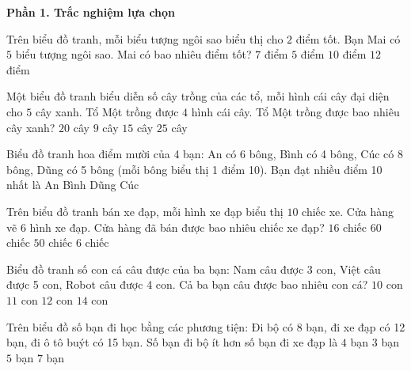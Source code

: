 \textbf{Phần 1. Trắc nghiệm lựa chọn}

\begin{ex} %
Trên biểu đồ tranh, mỗi biểu tượng ngôi sao biểu thị cho $2$ điểm tốt. Bạn Mai có $5$ biểu tượng ngôi sao. Mai có bao nhiêu điểm tốt?
\choice
{$7$ điểm}
{$5$ điểm}
{\True $10$ điểm}
{$12$ điểm}
\end{ex}

\begin{ex} %
Một biểu đồ tranh biểu diễn số cây trồng của các tổ, mỗi hình cái cây đại diện cho $5$ cây xanh. Tổ Một trồng được $4$ hình cái cây. Tổ Một trồng được bao nhiêu cây xanh?
\choice
{\True $20$ cây}
{$9$ cây}
{$15$ cây}
{$25$ cây}
\end{ex}

\begin{ex} %
Biểu đồ tranh hoa điểm mười của 4 bạn: An có 6 bông, Bình có 4 bông, Cúc có 8 bông, Dũng có 5 bông (mỗi bông biểu thị 1 điểm 10). Bạn đạt nhiều điểm 10 nhất là
\choice
{An}
{Bình}
{Dũng}
{\True Cúc}
\end{ex}

\begin{ex} %
Trên biểu đồ tranh bán xe đạp, mỗi hình xe đạp biểu thị $10$ chiếc xe. Cửa hàng vẽ $6$ hình xe đạp. Cửa hàng đã bán được bao nhiêu chiếc xe đạp?
\choice
{$16$ chiếc}
{\True $60$ chiếc}
{$50$ chiếc}
{$6$ chiếc}
\end{ex}

\begin{ex} %
Biểu đồ tranh số con cá câu được của ba bạn: Nam câu được 3 con, Việt câu được 5 con, Robot câu được 4 con. Cả ba bạn câu được bao nhiêu con cá?
\choice
{$10$ con}
{$11$ con}
{\True $12$ con}
{$14$ con}
\end{ex}

\begin{ex} %
Trên biểu đồ số bạn đi học bằng các phương tiện: Đi bộ có 8 bạn, đi xe đạp có 12 bạn, đi ô tô buýt có 15 bạn. Số bạn đi bộ ít hơn số bạn đi xe đạp là
\choice
{\True $4$ bạn}
{$3$ bạn}
{$5$ bạn}
{$7$ bạn}
\end{ex}

